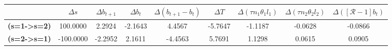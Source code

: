 \begin{tiny}\begin{tabular}{|l|c|c|c|c|c|c|c|c|}
\hline
&\textbf{$\Delta s$}&\textbf{$\Delta b_{t+1}$}&\textbf{$\Delta b_{t}$}&\textbf{$\Delta (b_{t+1}-b_{t})$}&\textbf{$\Delta T$}&\textbf{$\Delta (\tau n_1\theta_1 l_1 )$}&\textbf{$\Delta (\tau n_2\theta_2 l_2)$}&\textbf{$\Delta ([\mathcal{R}-1]b_t)$}\\\hline
\textbf{(s=1->s=2)}&100.0000&2.2924&-2.1643&4.4567&-5.7647&-1.1187&-0.0628&-0.0866\\\hline
\textbf{ (s=2->s=1)}&-100.0000&-2.2952&2.1611&-4.4563&5.7691&1.1298&0.0615&0.0905\\\hline
\end{tabular}
\end{tiny}